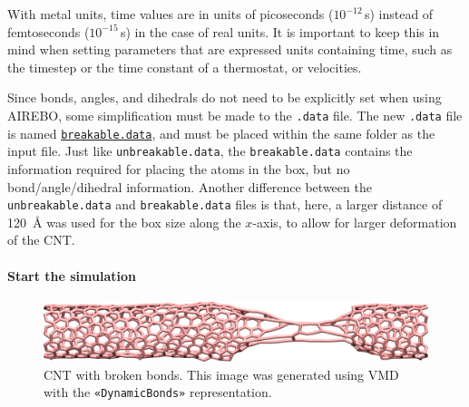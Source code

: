 \documentclass[9pt,tutorial]{livecoms}
\newcommand{\lmpcmdnote}[1]{\colorbox{note_listing}{\textcolor{command}{\small{#1}}}} %
\newcommand{\flecmd}[1]{\textcolor{command}{\texttt{#1}}} %
\newcommand{\guicmd}[1]{\textcolor{command}{\texttt{«#1»}}} %
\newcommand{\dwlcmd}[1]{\textcolor{download}{\texttt{#1}}} %
\newcommand{\filepath}{https://raw.githubusercontent.com/lammpstutorials/lammpstutorials-article/main/files/}
\begin{document}
\begin{note}
  With \lmpcmdnote{metal} units, time values are in units of picoseconds
  ($10^{-12}$\,s) instead of femtoseconds ($10^{-15}$\,s) in the case of
  \lmpcmdnote{real} units.  It is important to keep this in mind when
  setting parameters that are expressed units containing time, such as
  the timestep or the time constant of a thermostat, or velocities.
\end{note}

Since bonds, angles, and dihedrals do not need to be explicitly set when
using AIREBO, some simplification must be made to the \flecmd{.data}
file.  The new \flecmd{.data} file is named
%
\href{\filepath tutorial2/breakable.data}{\dwlcmd{breakable.data}},
%
and must be placed within the same folder as the input file.  Just like
\flecmd{unbreakable.data}, the \flecmd{breakable.data} contains the
information required for placing the atoms in the box, but no
bond/angle/dihedral information.  Another difference between the
\flecmd{unbreakable.data} and \flecmd{breakable.data} files is that,
here, a larger distance of 120~Å was used for the box size along
the $x$-axis, to allow for larger deformation of the CNT.

\paragraph{Start the simulation}

\begin{figure}
\centering
\includegraphics[width=\linewidth]{CNT-deformed-breakable}
\caption{CNT with broken bonds.  This image was generated using
VMD~\cite{vmd_home,humphrey1996vmd} with the \guicmd{DynamicBonds} representation.}
\label{fig:CNT-deformed-breakable}
\end{figure}
\end{document}
